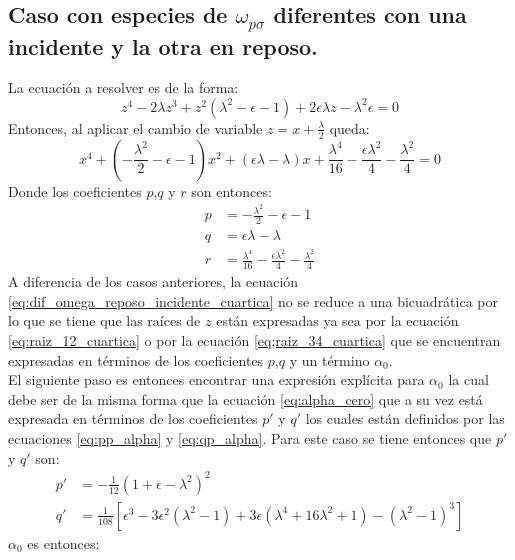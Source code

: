 \documentclass[12pt]{article}
\begin{document}
\subsection*{Caso con especies de $\omega_{p\sigma}$ diferentes con una incidente y la otra en reposo.}
La ecuación a resolver es de la forma:
\begin{equation}
\label{eq:dif_omega_reposo_incidente_cuartica}
z^4 - 2\lambda z^3 + z^2(\lambda^2 -\epsilon -1) +2\epsilon \lambda z - \lambda^2
\epsilon =0
\end{equation}
Entonces, al aplicar el cambio de variable $z=x+\frac{\lambda}{2}$ queda:
\begin{equation}
x^4 + (-\frac{\lambda^2}{2} -\epsilon -1)x^2 + (\epsilon \lambda - \lambda)x + \frac{\lambda^4}{16}-\frac{\epsilon \lambda^2}{4}-\frac{\lambda^2}{4}=0
\end{equation}
Donde los coeficientes $p$,$q$ y $r$ son entonces:
\begin{align}
p&=-\frac{\lambda^2}{2} -\epsilon -1\\
q&=\epsilon \lambda - \lambda\\
r&=\frac{\lambda^4}{16}-\frac{\epsilon \lambda^2}{4}-\frac{\lambda^2}{4}
\end{align}
A diferencia de los casos anteriores, la ecuación \ref{eq:dif_omega_reposo_incidente_cuartica} no se reduce a una bicuadrática por lo que se tiene que las raíces de $z$ están expresadas ya sea por la ecuación \ref{eq:raiz_12_cuartica} o por la ecuación \ref{eq;raiz_34_cuartica} que se encuentran expresadas en términos de los coeficientes $p$,$q$ y un término $\alpha_0$.\\
El siguiente paso es entonces encontrar una expresión explícita para $\alpha_0$ la cual debe ser de la misma forma que la ecuación \ref{eq:alpha_cero} que a su vez está expresada en términos de los coeficientes $p'$ y $q'$ los cuales están definidos por las ecuaciones \ref{eq:pp_alpha} y \ref{eq:qp_alpha}. Para este caso se tiene entonces que $p'$ y $q'$ son:
\begin{align}
\label{eq:pp_alpha_diferente_omega_reposo}
p'&= -\frac{1}{12}\left(1+\epsilon-\lambda^2\right)^2\\
\label{eq:qp_alpha_diferente_omega_reposo}
q'&= \frac{1}{108} \left[ \epsilon^3 -3\epsilon^2 (\lambda^2
-1)+3\epsilon(\lambda^4 + 16\lambda^2 +1)- (\lambda^2 -1)^3 \right]
\end{align}
$\alpha_0$ es entonces:
\end{document}
